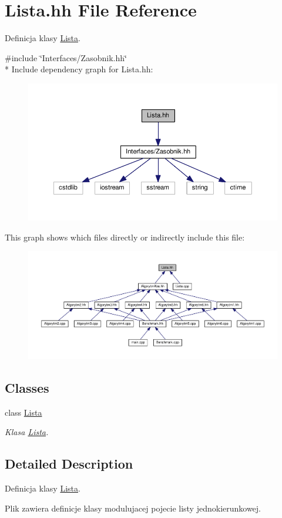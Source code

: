 \hypertarget{a00048}{}\section{Lista.\+hh File Reference}
\label{a00048}


Definicja klasy \hyperlink{a00014}{Lista}.  


{\ttfamily \#include \char`\"{}Interfaces/\+Zasobnik.\+hh\char`\"{}}\\*
Include dependency graph for Lista.\+hh\+:
\nopagebreak
\begin{figure}[H]
\begin{center}
\leavevmode
\includegraphics[width=350pt]{a00101}
\end{center}
\end{figure}
This graph shows which files directly or indirectly include this file\+:
\nopagebreak
\begin{figure}[H]
\begin{center}
\leavevmode
\includegraphics[width=350pt]{a00102}
\end{center}
\end{figure}
\subsection*{Classes}
\begin{DoxyCompactItemize}
\item 
class \hyperlink{a00014}{Lista}
\begin{DoxyCompactList}\small\item\em Klasa \hyperlink{a00014}{Lista}. \end{DoxyCompactList}\end{DoxyCompactItemize}


\subsection{Detailed Description}
Definicja klasy \hyperlink{a00014}{Lista}. 

Plik zawiera definicje klasy modulujacej pojecie listy jednokierunkowej. 